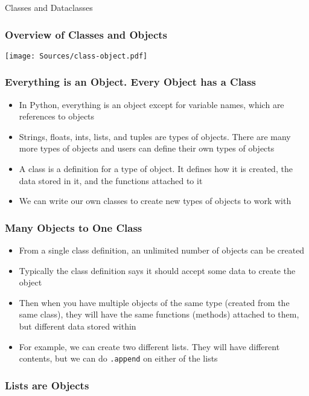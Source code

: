 \documentclass[handout, 11pt]{beamer}
\begin{document}
\begin{section}[Classes]{Classes and Dataclasses}
\begin{frame}
\frametitle{Overview of Classes and Objects}
\begin{center}
\begin{adjustbox}{width=0.9\textwidth, height=0.8\textheight, keepaspectratio}
\texttt{[image: Sources/class-object.pdf]}
\end{adjustbox}
\end{center}
\end{frame}
\begin{frame}
\frametitle{Everything is an Object. Every Object has a Class}
\begin{itemize}
\item In Python, everything is an object except for variable names, which are references to objects
\vfill
\item Strings, floats, ints, lists, and tuples are types of objects. There are many more types of objects and users can define their own types of objects
\vfill
\item A class is a definition for a type of object. It defines how it is created, the data stored in it, and the functions attached to it
\vfill
\item We can write our own classes to create new types of objects to work with
\end{itemize}
\end{frame}
\begin{frame}
\frametitle{Many Objects to One Class}
\begin{itemize}
\item From a single class definition, an unlimited number of objects can be created
\vfill
\item Typically the class definition says it should accept some data to create the object
\vfill
\item Then when you have multiple objects of the same type (created from the same class), they will have the same functions (methods) attached to them, but different data stored within
\vfill
\item For example, we can create two different lists. They will have different contents, but we can
do
\texttt{.append}
on either of the lists
\end{itemize}
\end{frame}
\begin{frame}
\frametitle{Lists are Objects}
\begin{adjustbox}{width=0.425\textwidth, height=0.8\textheight, keepaspectratio}

\end{adjustbox}
\end{frame}
\end{section}
\end{document}
